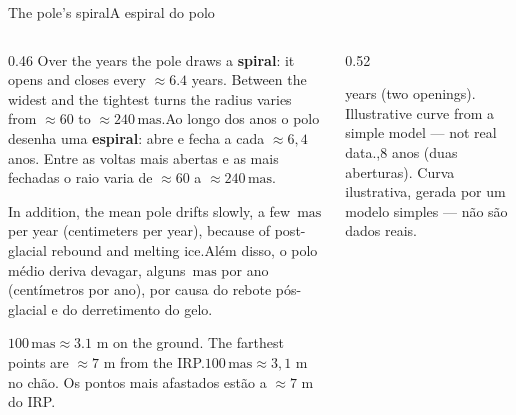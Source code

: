 \documentclass[aspectratio=169,11pt]{beamer}
\newcommand{\tr}[2]{\ifEN#2\else#1\fi}
\newcommand{\bnum}[1]{\textbf{\textcolor{mTeal}{#1}}}
\newcommand{\mas}{\ensuremath{\,\mathrm{mas}}\xspace}
\begin{document}
\begin{frame}{\tr{A espiral do polo}{The pole's spiral}}
  \begin{columns}[T]
    \begin{column}{0.46\textwidth}
      \small
      \tr{Ao longo dos anos o polo desenha uma \bnum{espiral}: abre e fecha a cada $\approx 6{,}4$ anos. Entre as voltas mais abertas e as mais fechadas o raio varia de $\approx 60$ a $\approx 240\mas$.}{Over the years the pole draws a \bnum{spiral}: it opens and closes every $\approx 6.4$ years. Between the widest and the tightest turns the radius varies from $\approx 60$ to $\approx 240\mas$.}
      \medskip

      \tr{Além disso, o polo médio deriva devagar, alguns $\mas$ por ano (centímetros por ano), por causa do rebote pós-glacial e do derretimento do gelo.}{In addition, the mean pole drifts slowly, a few $\mas$ per year (centimeters per year), because of post-glacial rebound and melting ice.}
      \medskip

      \begin{ideia}[title={\tr{Quanto é isso?}{How much is that?}}]
        \footnotesize\tr{$100\mas \approx 3{,}1$ m no chão. Os pontos mais afastados estão a $\approx 7$ m do IRP.}{$100\mas \approx 3.1$ m on the ground. The farthest points are $\approx 7$ m from the IRP.}
      \end{ideia}
    \end{column}
    \begin{column}{0.52\textwidth}
      \centering
      \par\smallskip
      {\scriptsize\textcolor{mStoneMid}{\tr{12,8 anos (duas aberturas). Curva ilustrativa, gerada por um modelo simples --- não são dados reais.}{12.8 years (two openings). Illustrative curve from a simple model --- not real data.}}}
    \end{column}
  \end{columns}
\end{frame}
\end{document}
